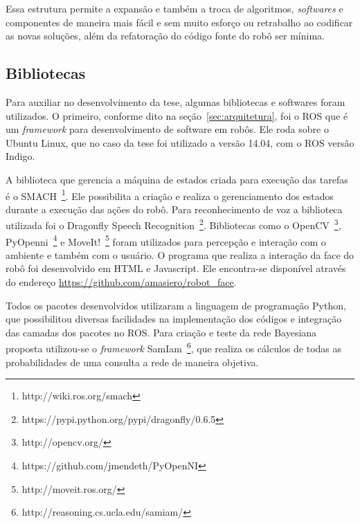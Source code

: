 Essa estrutura permite a expansão e também a troca de algoritmos, \textit{softwares} e componentes de maneira mais fácil e sem muito esforço ou retrabalho ao codificar as novas soluções, além da refatoração do código fonte do robô ser mínima.


\subsection{Bibliotecas}
\label{sec:bibliotecas}
Para auxiliar no desenvolvimento da tese, algumas bibliotecas e softwares foram utilizados. O primeiro, conforme dito na seção~\ref{sec:arquitetura}, foi o ROS que é um \emph{framework} para desenvolvimento de software em robôs. Ele roda sobre o Ubuntu Linux, que no caso da tese foi utilizado a versão 14.04, com o ROS versão Indigo.

A biblioteca que gerencia a máquina de estados criada para execução das tarefas é o SMACH~\footnote{http://wiki.ros.org/smach}. Ele possibilita a criação e realiza o gerenciamento dos estados durante a execução das ações do robô. Para reconhecimento de voz a biblioteca utilizada foi o Dragonfly Speech Recognition~\footnote{https://pypi.python.org/pypi/dragonfly/0.6.5}. Bibliotecas como o OpenCV~\footnote{http://opencv.org/}, PyOpenni~\footnote{https://github.com/jmendeth/PyOpenNI} e MoveIt!~\footnote{http://moveit.ros.org/} foram utilizados para percepção e interação com o ambiente e também com o usuário. O programa que realiza a interação da face do robô foi desenvolvido em HTML e Javascript. Ele encontra-se disponível através do endereço \url{https://github.com/amasiero/robot\_face}.

Todos os pacotes desenvolvidos utilizaram a linguagem de programação Python, que possibilitou diversas facilidades na implementação dos códigos e integração das camadas dos pacotes no ROS. Para criação e teste da rede Bayesiana proposta utilizou-se o \emph{framework} SamIam~\footnote{http://reasoning.cs.ucla.edu/samiam/}, que realiza os cálculos de todas as probabilidades de uma consulta a rede de maneira objetiva.


